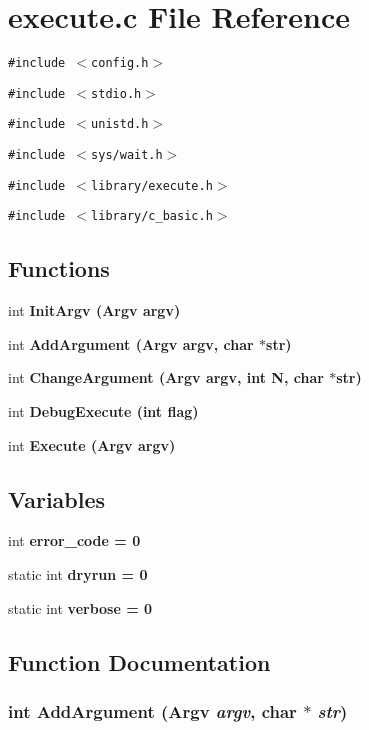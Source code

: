 \section{execute.c File Reference}
\label{execute_8c}
{\tt \#include $<$config.h$>$}\par
{\tt \#include $<$stdio.h$>$}\par
{\tt \#include $<$unistd.h$>$}\par
{\tt \#include $<$sys/wait.h$>$}\par
{\tt \#include $<$library/execute.h$>$}\par
{\tt \#include $<$library/c\_\-basic.h$>$}\par
\subsection*{Functions}
\begin{CompactItemize}
\item 
int \bf{Init\-Argv} (\bf{Argv} argv)
\item 
int \bf{Add\-Argument} (\bf{Argv} argv, char $\ast$str)
\item 
int \bf{Change\-Argument} (\bf{Argv} argv, int N, char $\ast$str)
\item 
int \bf{Debug\-Execute} (int flag)
\item 
int \bf{Execute} (\bf{Argv} argv)
\end{CompactItemize}
\subsection*{Variables}
\begin{CompactItemize}
\item 
int \bf{error\_\-code} = 0
\item 
static int \bf{dryrun} = 0
\item 
static int \bf{verbose} = 0
\end{CompactItemize}


\subsection{Function Documentation}
\subsubsection{\setlength{\rightskip}{0pt plus 5cm}int Add\-Argument (\bf{Argv} {\em argv}, char $\ast$ {\em str})}\label{execute_8c_630bbf2b20fe58ee74d72b041eb668f3}




